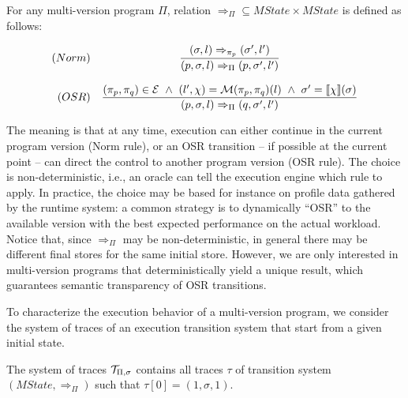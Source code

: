 \begin{definition}
\label{de:osr-semantics}
For any multi-version program $\Pi$, relation $\Rightarrow_{\Pi}\subseteq MState\times MState$ is defined as follows:%

\begin{footnotesize}
\begin{equation}
\label{eq:mv-big-step}
\begin{array}{rc}
(Norm)
&
\dfrac
{(\sigma, l)\Rightarrow_{\pi_p} (\sigma',l')}
{(p,\sigma, l)\Rightarrow_{\Pi} (p,\sigma',l')}
\\
\\
(OSR)
&
\dfrac
{(\pi_p,\pi_q)\in {\cal E} ~ \wedge ~ (l',\chi)={\cal M}(\pi_p,\pi_q)(l) ~ \wedge ~ \sigma'=[\![\chi]\!](\sigma)}
{(p,\sigma, l)\Rightarrow_{\Pi} (q,\sigma',l')}\\
\end{array}
\end{equation}
\end{footnotesize}
\end{definition}

\noindent The meaning is that at any time, execution can either continue in the current program version (Norm rule), or an OSR transition -- if possible at the current point -- can direct the control to another program version (OSR rule). The choice is non-deterministic, i.e., an oracle can tell the execution engine which rule to apply. In practice, the choice may be based for instance on profile data gathered by the runtime system: a common strategy is to dynamically ``OSR'' to the available version with the best expected performance on the actual workload. Notice that, since $\Rightarrow_{\Pi}$ may be non-deterministic, in general there may be different final stores for the same initial store. However, we are only interested in multi-version programs that deterministically yield a unique result, which guarantees semantic transparency of OSR transitions. 

To characterize the execution behavior of a multi-version program, we consider the system of traces of an execution transition system that start from a given initial state.

\begin{definition}
\label{de:mvp-exec-system}
The system of traces ${\cal T}_{\Pi,\sigma}$ contains all traces $\tau$ of transition system $(MState,\Rightarrow_{\Pi})$ such that $\tau[0]=(1,\sigma,1)$.
\end{definition}

